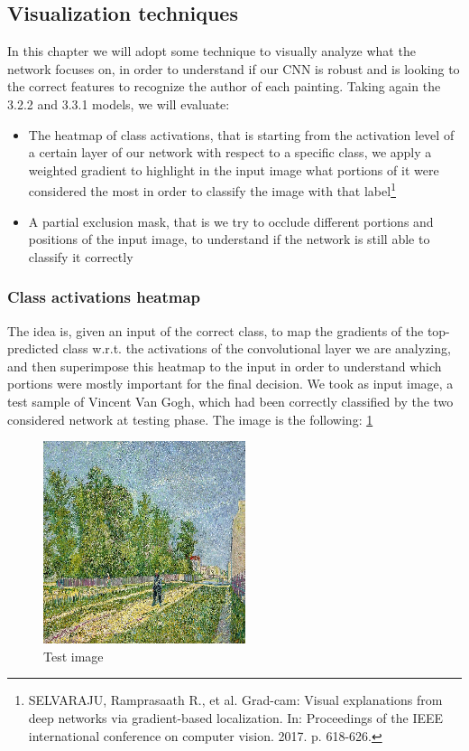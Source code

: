 \subsection{Visualization techniques}
In this chapter we will adopt some technique to visually analyze what the network focuses on, in order to understand if our CNN is robust and is looking to the correct features to recognize the author of each painting. Taking again the 3.2.2 and 3.3.1 models, we will evaluate:
\begin{itemize}
\item The heatmap of class activations, that is starting from the activation level of a certain layer of our network with respect to a specific class, we apply a weighted gradient to highlight in the input image what portions of it were considered the most in order to classify the image with that label\footnote{SELVARAJU, Ramprasaath R., et al. Grad-cam: Visual explanations from deep networks via gradient-based localization. In: Proceedings of the IEEE international conference on computer vision. 2017. p. 618-626.}
\item A partial exclusion mask, that is we try to occlude different portions and positions of the input image, to understand if the network is still able to classify it correctly
\end{itemize} 

\subsubsection{Class activations heatmap}
The idea is, given an input of the correct class, to map the gradients of the top-predicted class w.r.t. the activations of the convolutional layer we are analyzing, and then superimpose this heatmap to the input in order to understand which portions were mostly important for the final decision.
We took as input image, a test sample of Vincent Van Gogh, which had been correctly classified by the two considered network at testing phase. The image is the following: \ref{fig: Test_image_visualization}


\begin{figure}[H]
	\centering
	\includegraphics[height=0.6\textwidth]{img/scratch/visualization/test_image.png}
	\caption{Test image}
	\label{fig: Test_image_visualization}
\end{figure}

